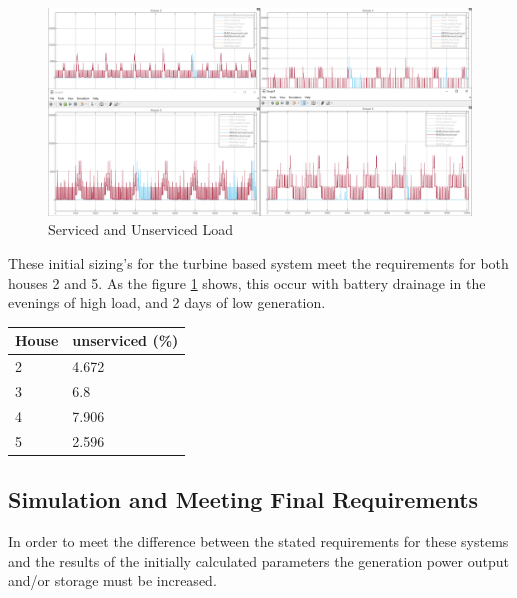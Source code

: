 \documentclass[journal]{IEEEtran}
\begin{document}
                \begin{figure}[h!]
                        \centering
                        \includegraphics[width=0.7\linewidth]{fig/init_wind_load.png}
                        \caption{Serviced and Unserviced Load}
                        \label{fig:wind_init}
                \end{figure} 

                These initial sizing's for the turbine based system meet the requirements for both houses 2 and 5. As the figure \ref{fig:wind_init} shows, this occur with battery drainage in the evenings of high load, and 2 days of low generation.

                \begin{table}[h!]
                        \centering
                        \begin{tabular}{|l|l|}
                        \hline
                        \textbf{House} & \textbf{unserviced (\%)} \\ \hline
                        2              & 4.672                    \\ \hline
                        3              & 6.8                      \\ \hline
                        4              & 7.906                    \\ \hline
                        5              & 2.596                    \\ \hline
                        \end{tabular}
                        \end{table}
                
                

        
        \subsection{Simulation and Meeting Final Requirements}
        In order to meet the difference between the stated requirements for these systems and the results of the initially calculated parameters the generation power output and/or storage must be increased.
\end{document}
